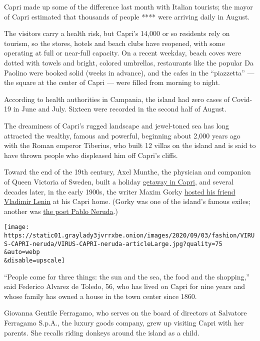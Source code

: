 Capri made up some of the difference last month with Italian tourists;
the mayor of Capri estimated that thousands of people **** were arriving
daily in August.

The visitors carry a health risk, but Capri's 14,000 or so residents
rely on tourism, so the stores, hotels and beach clubs have reopened,
with some operating at full or near-full capacity. On a recent weekday,
beach coves were dotted with towels and bright, colored umbrellas,
restaurants like the popular Da Paolino were booked solid (weeks in
advance), and the cafes in the ``piazzetta'' --- the square at the
center of Capri --- were filled from morning to night.

According to health authorities in Campania, the island had zero cases
of Covid-19 in June and July. Sixteen were recorded in the second half
of August.

The dreaminess of Capri's rugged landscape and jewel-toned sea has long
attracted the wealthy, famous and powerful, beginning about 2,000 years
ago with the Roman emperor Tiberius, who built 12 villas on the island
and is said to have thrown people who displeased him off Capri's cliffs.

Toward the end of the 19th century, Axel Munthe, the physician and
companion of Queen Victoria of Sweden, built a holiday
\href{http://www.villasanmichele.eu/}{getaway in Capri}, and several
decades later, in the early 1900s, the writer Maxim Gorky
\href{https://www.idfa.nl/en/film/d931478e-6c95-42a5-910b-1d960452536e/the-other-revolution-gorkij-and-lenin-on-capri/docs-for-sale}{hosted
his friend Vladimir Lenin} at his Capri home. (Gorky was one of the
island's famous exiles; another was
\href{https://www.sothebys.com/en/buy/auction/2020/music-continental-books-and-medieval-manuscripts/pablo-neruda-16-letters-together-with-documents}{the
poet Pablo Neruda}.)

\texttt{[image: https://static01.graylady3jvrrxbe.onion/images/2020/09/03/fashion/VIRUS-CAPRI-neruda/VIRUS-CAPRI-neruda-articleLarge.jpg?quality=75\\\&auto=webp\\\&disable=upscale]}

``People come for three things: the sun and the sea, the food and the
shopping,'' said Federico Alvarez de Toledo, 56, who has lived on Capri
for nine years and whose family has owned a house in the town center
since 1860.

Giovanna Gentile Ferragamo, who serves on the board of directors at
Salvatore Ferragamo S.p.A., the luxury goods company, grew up visiting
Capri with her parents. She recalls riding donkeys around the island as
a child.

